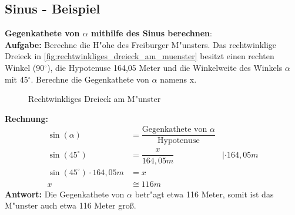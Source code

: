 \documentclass{standalone}
\begin{document}
\subsection{Sinus - Beispiel}
\textbf{Gegenkathete von $\alpha$ mithilfe des Sinus berechnen}: \\
\textbf{Aufgabe:} Berechne die H{"o}he des Freiburger M{"u}nsters. Das rechtwinklige Dreieck in \autoref{fig:rechtwinkliges_dreieck_am_muenster} besitzt einen rechten Winkel (90$^\circ$), die Hypotenuse 164,05 Meter und die Winkelweite des Winkels $\alpha$ mit 45$^\circ$. Berechne die Gegenkathete von $\alpha$ namens x.\\
\begin{figure}[hb!]
  \centeringf
  \centering
  \def\svgwidth{300px}
  
  \caption{Rechtwinkliges Dreieck am M{"u}nster}
  \label{fig:rechtwinkliges_dreieck_am_muenster}
\end{figure}

\noindent\textbf{Rechnung:}
\begin{align}
  \sin(\alpha)                  & = \dfrac{\text{Gegenkathete von $\alpha$}}{\text{Hypotenuse}} \tag{1}                                                     \\
  \sin(45^\circ )               & = \dfrac{x}{164,05m}                                                                             & |\cdot 164,05m \tag{2} \\
  \sin(45^\circ ) \cdot 164,05m & = x                                                                                      \tag{3}                          \\
  x                             & \cong 116m
\end{align}
\textbf{Antwort:} Die Gegenkathete von $\alpha$ betr{"a}gt etwa 116 Meter, somit ist das M{"u}nster auch etwa 116 Meter gro{\ss}.
\end{document}
